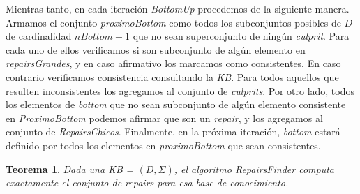 \documentclass[11pt,a4paper,twoside]{tesis}
\begin{document}
Mientras tanto, en cada iteración \textit{BottomUp} procedemos de la siguiente manera. Armamos el conjunto \textit{proximoBottom} como todos los subconjuntos posibles de $D$ de cardinalidad $nBottom + 1$ que no sean superconjunto de ningún \textit{culprit}. Para cada uno de ellos verificamos si son subconjunto de algún elemento en \textit{repairsGrandes}, y en caso afirmativo los marcamos como consistentes. En caso contrario verificamos consistencia consultando la \textit{KB}. Para todos aquellos que resulten inconsistentes los agregamos al conjunto de \textit{culprits}. Por otro lado, todos los elementos de \textit{bottom} que no sean subconjunto de algún elemento consistente en \textit{ProximoBottom} podemos afirmar que son un \textit{repair}, y los agregamos al conjunto de \textit{RepairsChicos}. Finalmente, en la próxima iteración, \textit{bottom} estará definido por todos los elementos en \textit{proximoBottom} que sean consistentes.


\newtheorem{theorem}{Teorema} 
\newtheorem{lemma}[theorem]{Lema}

\begin{theorem}
Dada una \textit{KB} = $(D, \Sigma)$, el algoritmo \textit{RepairsFinder} computa exactamente el conjunto de \textit{repairs} para esa base de conocimiento.
\end{theorem}
\end{document}
